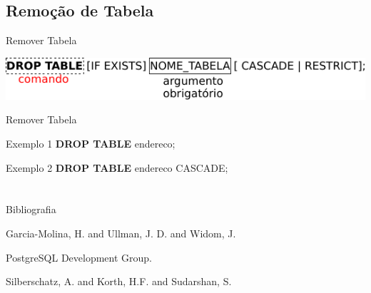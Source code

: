 \documentclass[xcolor=x11names,compress]{beamer}
\begin{document}
\subsection{Remoção de Tabela}

\begin{frame}{Remover Tabela}

\centering \includegraphics[keepaspectratio,width=\textwidth]{drop_table}

\end{frame}

\begin{frame}{Remover Tabela}

\begin{alertblock}{Exemplo 1}
\textbf{DROP TABLE} endereco;
\end{alertblock}

\begin{alertblock}{Exemplo 2}
\textbf{DROP TABLE} endereco CASCADE;
\end{alertblock}

\end{frame}

\section{}

\begin{frame}{Bibliografia}

\begin{thebibliography}{Garcia-MolinaEtAl, 2008}


Garcia-Molina, H. and Ullman, J. D. and Widom, J.



PostgreSQL Development Group.



Silberschatz, A. and Korth, H.F. and Sudarshan, S.


\end{thebibliography}

\end{frame}
\end{document}
